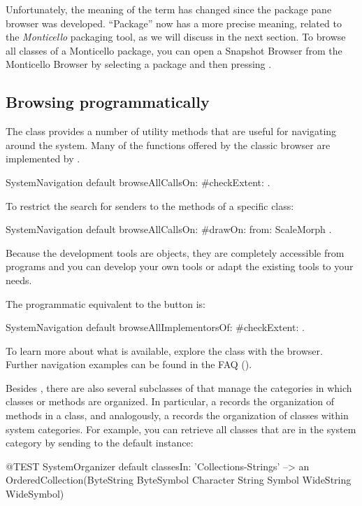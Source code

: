 \documentclass[a4paper,10pt,twoside]{book}
\begin{document}
Unfortunately, the meaning of the term  has changed since the package pane browser was developed.  ``Package'' now has a more precise meaning, related to the \emph{Monticello} packaging tool, as we will discuss in the next section.  To browse all classes of a Monticello package, you can open a Snapshot Browser from the Monticello Browser by selecting a package and then pressing .

\subsection{Browsing programmatically}

The class  provides a number of utility methods that are useful for navigating around the system.
Many of the functions offered by the classic browser are implemented by .

\begin{code}{}
SystemNavigation default browseAllCallsOn: #checkExtent: .
\end{code}
To restrict the search for senders to the methods of a specific class:
\begin{code}{}
SystemNavigation default browseAllCallsOn: #drawOn: from: ScaleMorph .
\end{code}
Because the development tools are objects, they are completely accessible from programs and you can develop your own tools or adapt the existing tools to your needs.

The programmatic equivalent to the  button is:
\begin{code}{}
SystemNavigation default browseAllImplementorsOf: #checkExtent: .
\end{code}

To learn more about what is available, explore the class  with the browser.
Further navigation examples can be found in the FAQ ().

Besides , there are also several subclasses of  that manage the categories in which classes or methods are organized.
In particular, a  records the organization of methods in a class, and analogously, a  records the organization of classes within system categories.
For example, you can retrieve all classes that are in the system category  by sending  to the default  instance:
\begin{code}{@TEST}
SystemOrganizer default classesIn: 'Collections-Strings' --> an OrderedCollection(ByteString ByteSymbol Character String Symbol WideString WideSymbol)
\end{code}
\end{document}
